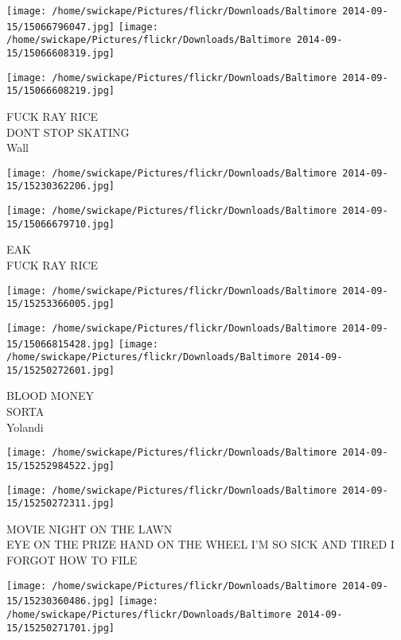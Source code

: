 \documentclass[10pt,letterpaper]{article}
\begin{document}
\texttt{[image: /home/swickape/Pictures/flickr/Downloads/Baltimore 2014-09-15/15066796047.jpg]}
\texttt{[image: /home/swickape/Pictures/flickr/Downloads/Baltimore 2014-09-15/15066608319.jpg]}

\vspace{0.25in}
\texttt{[image: /home/swickape/Pictures/flickr/Downloads/Baltimore 2014-09-15/15066608219.jpg]}

FUCK RAY RICE\\
DONT STOP SKATING\\
Wall\\
\pagebreak

\texttt{[image: /home/swickape/Pictures/flickr/Downloads/Baltimore 2014-09-15/15230362206.jpg]}

\vspace{0.25in}
\texttt{[image: /home/swickape/Pictures/flickr/Downloads/Baltimore 2014-09-15/15066679710.jpg]}

EAK\\
FUCK RAY RICE\\
\pagebreak

\texttt{[image: /home/swickape/Pictures/flickr/Downloads/Baltimore 2014-09-15/15253366005.jpg]}

\vspace{0.25in}
\texttt{[image: /home/swickape/Pictures/flickr/Downloads/Baltimore 2014-09-15/15066815428.jpg]}
\texttt{[image: /home/swickape/Pictures/flickr/Downloads/Baltimore 2014-09-15/15250272601.jpg]}

BLOOD MONEY\\
SORTA\\
Yolandi\\
\pagebreak

\texttt{[image: /home/swickape/Pictures/flickr/Downloads/Baltimore 2014-09-15/15252984522.jpg]}

\vspace{0.25in}
\texttt{[image: /home/swickape/Pictures/flickr/Downloads/Baltimore 2014-09-15/15250272311.jpg]}

MOVIE NIGHT ON THE LAWN\\
EYE ON THE PRIZE HAND ON THE WHEEL I'M SO SICK AND TIRED I FORGOT HOW TO FILE\\
\pagebreak

\texttt{[image: /home/swickape/Pictures/flickr/Downloads/Baltimore 2014-09-15/15230360486.jpg]}
\texttt{[image: /home/swickape/Pictures/flickr/Downloads/Baltimore 2014-09-15/15250271701.jpg]}
\end{document}

